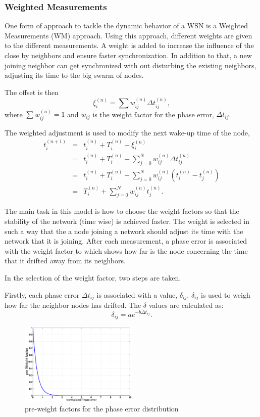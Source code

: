 \documentclass[journal]{IEEEtran}
\begin{document}
\subsubsection{\textbf{Weighted Measurements}}
One form of approach to tackle the dynamic behavior of a WSN is a
Weighted Measurements (WM) approach. Using this approach, different
weights are given to the different measurements. A weight is added to
increase the influence of the close by neighbors and ensure
faster synchronization. In addition to that, a new joining neighbor
can get synchronized with out disturbing the existing neighbors,
adjusting its time to the big swarm of nodes.\par
The offset is then
\begin{equation}
\xi_i^{(n)} = \sum{w_{ij}^{(n)}\Delta t_{ij}^{(n)}} ,
\end{equation}
where $\sum{w_{ij}^{(n)}= 1}$ and $w_{ij}$ is the weight factor for the phase error, $\Delta t_{ij}$.
\par
The weighted adjustment is used to modify the next wake-up time of
the node,
\begin{eqnarray*}
t_i^{(n+1)} &=& t_i^{(n)} + T_i^{(n)} - \xi_i^{(n)} \\ &=& t_i^{(n)}
+ T_i^{(n)} - \sum_{j=0}^N{w_{ij}^{(n)}\Delta t_{ij}^{(n)}} \\ &=&
t_i^{(n)}+ T_i^{(n)} -
\sum_{j=0}^N{w_{ij}^{(n)}(t_i^{(n)}-t_j^{(n)})} \\ &=& T_i^{(n)} + \sum_{j=0}^N{w_{ij}^{(n)}t_j^{(n)}}.
\end{eqnarray*}
\par
The main task in this model is how to choose the weight factors
so that the stability of the network (time wise) is achieved faster. The weight is selected in such a way that the a node
joining a network should adjust its time with the network that it is
joining. After each measurement, a phase error is associated with
the weight  factor to which shows how far is the node concerning the
time that it drifted away from its neighbors.
\par \noindent In the selection of the weight factor, two steps are taken. \par \noindent
Firstly, each phase error $\Delta t_{ij}$ is associated with a value, $\delta_{ij}$. $\delta_{ij}$ is used to weigh how far the neighbor nodes has drifted. The $\delta$ values are calculated as:
\begin{equation}
\delta_{ij} = ae^{-b\Delta t_{ij}}.
\end{equation}
\begin{figure}[t]
\centering
\includegraphics[width= 0.5\textwidth]{weightphase}
\caption{pre-weight factors for the phase error distribution}
\label{weight}
\end{figure} \noindent
\end{document}
